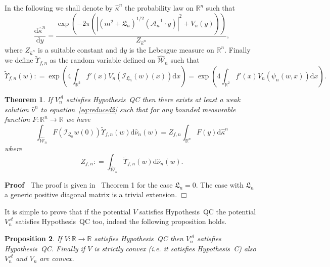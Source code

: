 \documentclass[a4paper,10pt]{article}
\newcommand{\mathd}{\mathrm{d}}
\newenvironment{proof}{\noindent\textbf{Proof\ }}{\hspace*{\fill}$\Box$\medskip}
\newtheorem{theorem}{Theorem}
\newtheorem{proposition}[theorem]{Proposition}
{\theorembodyfont{\rmfamily}\newtheorem{remark}[theorem]{Remark}}
\begin{document}
In the following we shall denote by $\hat{\kappa}^n$ the probability law on
$\mathbb{R}^n$ such that
\[ \frac{\mathd \hat{\kappa}^n}{\mathd y} = \frac{\exp (- 2 \pi (| (m^2 +
   \mathfrak{L}_n)^{1 / 2} (\mathcal{A}_n^{- 1} \cdot y) |^2 + V_n
   (y)))}{Z_{\hat{\kappa}^n}}, \]
where $Z_{\hat{\kappa}^n}$ is a suitable constant and $\mathd y$ is the
Lebesgue measure on $\mathbb{R}^n$. Finally we define $\tilde{\Upsilon}_{f,
n}$ as the random variable defined on $\widehat{\mathcal{W}}_n$ such that
\[ \tilde{\Upsilon}_{f, n} (w) : = \exp \left( 4 \int_{\mathbb{R}^2} f' (x)
   V_n (\mathcal{I}_{\mathfrak{L}_n} (w) (x)) \mathd x \right) = \exp \left( 4
   \int_{\mathbb{R}^2} f' (x) V_n (\psi_n (w, x)) \mathd x \right) . \]
\begin{theorem}
  \label{theorem:reduced1}If $V^{\mathcal{A}}_n$ satisfies Hypothesis~QC then
  there exists at least a weak solution $\hat{\nu}^n$ to
  equation~{\eqref{eq:reduced2}} such that for any bounded measurable function
  $F : \mathbb{R}^n \rightarrow \mathbb{R}$ we have
  \begin{equation}
    \int_{\widehat{\mathcal{W}}_n} F (\mathcal{} \mathcal{I}_{\mathfrak{L}_n}
    w (0)) \tilde{\Upsilon}_{f, n} (w) \mathd \hat{\nu}_n (w) = Z_{f, n}
    \int_{\mathbb{R}^n} F (y) \mathd \hat{\kappa}^n \label{eq:reduced4}
  \end{equation}
  where
  \begin{equation}
    Z_{f, n} : = \int_{\widehat{\mathcal{W}}_n} \tilde{\Upsilon}_{f, n} (w)
    \mathd \hat{\nu}_n (w) . \label{eq:Zf}
  \end{equation}
\end{theorem}

\begin{proof}
  The proof is given in~{\cite{Albeverio2018elliptic}} Theorem 1 for the case
  $\mathfrak{L}_n = 0$. The case with $\mathfrak{L}_n$ a generic positive
  diagonal matrix is a trivial extension.
\end{proof}

It is simple to prove that if the potential $V$ satisfies Hypothesis~QC the
potential $V_n^{\mathcal{A}}$ satisfies Hypothesis~QC too, indeed the
following proposition holds.

\begin{proposition}
  If $V : \mathbb{R} \rightarrow \mathbb{R}$ satisfies Hypothesis~QC then
  $V_n^{\mathcal{A}}$ satisfies Hypothesis~QC. Finally if $V$ is strictly
  convex (i.e. it satisfies Hypothesis~C) also $V_n^{\mathcal{A}}$ and $V_n$
  are convex.
\end{proposition}
\end{document}
